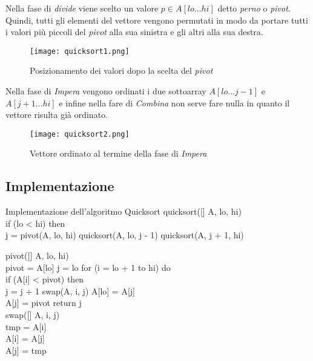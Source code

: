 Nella fase di \emph{divide} viene scelto un valore $p\in A[lo\dots hi]$ detto
\emph{perno} o \emph{pivot}. Quindi, tutti gli elementi del vettore vengono
permutati in modo da portare tutti i valori più piccoli del \emph{pivot} alla sua
sinistra e gli altri alla sua destra.

\begin{figure}[h!]
    \centering
    \texttt{[image: quicksort1.png]}
    \caption{Posizionamento dei valori dopo la scelta del \emph{pivot}}
\end{figure}\noindent
Nella fase di \emph{Impera} vengono ordinati i due sottoarray $A[lo\dots j-1]$
e $A[j+1\dots hi]$ e infine nella fare di \emph{Combina} non serve fare nulla in
quanto il vettore risulta già ordinato.

\begin{figure}[h!]
    \centering
    \texttt{[image: quicksort2.png]}
    \caption{Vettore ordinato al termine della fase di \emph{Impera}}
\end{figure}

\newpage
\subsection{Implementazione}
\begin{minicode}{Implementazione dell'algoritmo Quicksort}
    \ind quicksort([] A,  lo,  hi)\\
        \indf if (lo < hi) then\\
             j = pivot(A, lo, hi)\hfill{}
            quicksort(A, lo, j - 1)\hfill{}
            quicksort(A, j + 1, hi)\hfill{}

    \rmbreak\ind{} pivot([] A,  lo,  hi)\\
         pivot = A[lo]\hfill{}
         j = lo\hfill{}
        \indf for (i = lo + 1 to hi) do\\
            \indff if (A[i] < pivot) then\\
                j = j + 1\hfill{}
                swap(A, i, j)\hfill{}
        \indf A[lo] = A[j]\\
        \indf A[j] = pivot\hfill{}
        \indf return j\\

    \rmbreak\ind swap([] A,  i,  j)\\
         tmp = A[i]\\
        A[i] = A[j]\\
        A[j] = tmp
\end{minicode}

